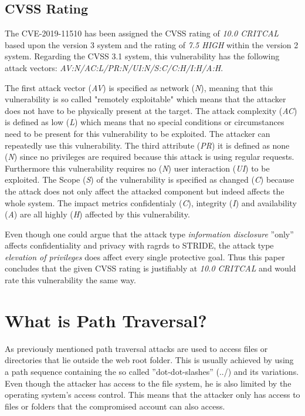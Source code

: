 \subsection{CVSS Rating}
\label{CVSS}
The CVE-2019-11510 has been assigned the CVSS rating of \textit{10.0 CRITCAL} based upon the version 3 system and the rating of \textit{7.5 HIGH} within the version 2 system. \autocite{NVDCVE:online} Regarding the CVSS 3.1 system, this vulnerability has the following attack vectors: \textit{AV:N/AC:L/PR:N/UI:N/S:C/C:H/I:H/A:H}. 

The first attack vector (\textit{AV}) is specified as network (\textit{N}), meaning that this vulnerability is so called "remotely exploitable" which means that the attacker does not have to be physically present at the target. The attack complexity (\textit{AC}) is defined as low (\textit{L}) which means that no special conditions or circumstances need to be present for this vulnerability to be exploited. The attacker can repeatedly use this vulnerability. The third attribute (\textit{PR}) it is defined as none (\textit{N}) since no privileges are required because this attack is using regular requests. Furthermore this vulnerability requires no (\textit{N}) user interaction (\textit{UI}) to be exploited. The Scope (\textit{S}) of the vulnerability is specified as changed (\textit{C}) because the attack does not only affect the attacked component but indeed affects the whole system. The impact metrics confidentialy (\textit{C}), integrity (\textit{I}) and availability (\textit{A}) are all highly (\textit{H}) affected by this vulnerability.\autocite{NVDCVSSv30:online}

Even though one could argue that the attack type \textit{information disclosure} ''only'' affects confidentiality and privacy with ragrds to STRIDE, the attack type \textit{elevation of privileges} does affect every single protective goal. \autocite{Schneider-Folie-2} Thus this paper concludes that the given CVSS rating is justifiably at \textit{10.0 CRITCAL} and would rate this vulnerability the same way.

\section{What is Path Traversal?}
\label{path-traversal}
As previously mentioned path traversal attacks are used to access files or directories that lie outside the web root folder. This is usually achieved by using a path sequence containing the so called ''dot-dot-slashes'' (../) and its variations. Even though the attacker has access to the file system, he is also limited by the operating system's access control. \autocite{OWASP-PathTraversal:online} This means that the attacker only has access to files or folders that the compromised account can also access. 

